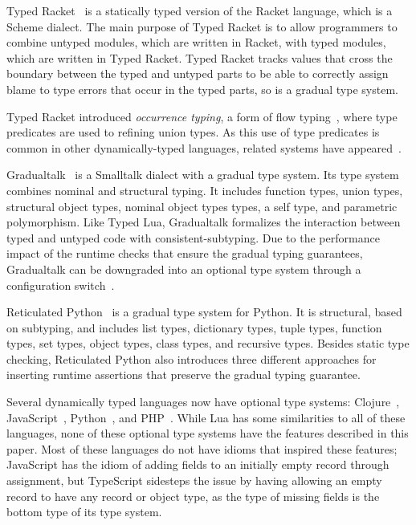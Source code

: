 \documentclass{sigplanconf}
\begin{document}
Typed Racket~\cite{tobin-hochstadt2008ts} is a statically typed version of the Racket language, which is a Scheme dialect.
The main purpose of Typed Racket is to allow programmers to combine untyped modules, which are written in Racket, with typed modules, which are written in Typed Racket. Typed Racket tracks
values that cross the boundary between the typed and
untyped parts to be able to correctly assign blame to type
errors that occur in the typed parts, so is a gradual type
system.

Typed Racket introduced {\em occurrence typing}, a form of
flow typing~\cite{tobin-hochstadt2010ltu}, where type
predicates are used to refining union types.
As this use of type predicates is common in other
dynamically-typed languages, related systems
have appeared~\cite{guha2011tlc,winther2011gtp,pearce2013ccf}.

Gradualtalk~\cite{allende2013gts} is a Smalltalk dialect 
with a gradual type system. Its type system combines
nominal and structural typing.
It includes function types, union types, structural object types,
nominal object types types, a self type, and parametric polymorphism. Like Typed Lua, Gradualtalk formalizes the
interaction between typed and untyped code with consistent-subtyping. Due to the performance impact of
the runtime checks that ensure the gradual typing guarantees,
Gradualtalk can be downgraded into an optional type system
through a configuration switch~\cite{allende2013cis}.

Reticulated Python~\cite{vitousek2014deg} is a
gradual type system for Python. It is structural, based on subtyping, and includes list types,
dictionary types, tuple types, function types, set types,
object types, class types, and recursive types.
Besides static type checking, Reticulated Python also introduces
three different approaches for inserting runtime assertions
that preserve the gradual typing guarantee.

Several dynamically typed languages now have optional
type systems: Clojure~\cite{bonnaire-sergeant2012typed-clojure},
JavaScript~\cite{typescript}, Python~\cite{mypy}, 
and PHP~\cite{hack}. While Lua has some similarities to
all of these languages, none of these optional type
systems have the features described in this paper.
Most of these languages do not have idioms
that inspired these features; JavaScript has the
idiom of adding fields to an initially empty
record through assignment, but TypeScript sidesteps
the issue by having allowing an empty record to
have any record or object type, as the type of
missing fields is the bottom type of its type system.
\end{document}
